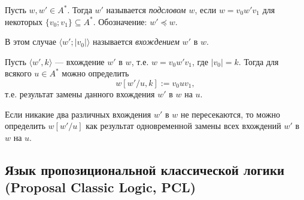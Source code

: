 \documentclass[12pt,a4paper]{article}
\begin{document}
    \begin{definition}
        Пусть $w, w' \in A^*$. Тогда $w'$ называется \emph{подсловом $w$}, если $w = v_0 w' v_1$ для некоторых $\{v_0; v_1\} \subseteq A^*$. Обозначение: $w' \preccurlyeq w$.

        В этом случае $\langle w'; |v_0|\rangle$ называется \emph{вхождением} $w'$ в $w$.
    \end{definition}

    \begin{definition}
        Пусть $\langle w', k\rangle$ --- вхождение $w'$ в $w$, т.е. $w = v_0 w' v_1$, где $|v_0| = k$. Тогда для всякого $u \in A^*$ можно определить
        \[w [w' / u, k] := v_0 u v_1,\]
        т.е. результат замены данного вхождения $w'$ в $w$ на $u$.
        
        Если никакие два различных вхождения $w'$ в $w$ не пересекаются, то можно определить $w [w' / u]$ как результат одновременной замены всех вхождений $w'$ в $w$ на $u$. 
    \end{definition}

    \subsection{Язык пропозициональной классической логики\\(Proposal Classic Logic, PCL)}
\end{document}
